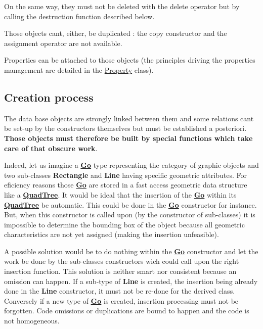 On the same way, they must not be deleted with the delete operator but by calling the destruction function described below.

Those objects can\textquotesingle{}t, either, be duplicated \+: the copy constructor and the assignment operator are not available.

Properties can be attached to those objects (the principles driving the properties management are detailed in the \mbox{\hyperlink{classHurricane_1_1Property}{Property}} class).\hypertarget{classHurricane_1_1DBo_sDBoCreation}{}\subsection{Creation process}\label{classHurricane_1_1DBo_sDBoCreation}
The data base objects are strongly linked between them and some relations can\textquotesingle{}t be set-\/up by the constructors themselves but must be established a posteriori. {\bfseries Those objects must therefore be built by special functions which take care of that obscure work}.

Indeed, let us imagine a {\bfseries \mbox{\hyperlink{classHurricane_1_1Go}{Go}}} type representing the category of graphic objects and two sub-\/classes {\bfseries Rectangle} and {\bfseries Line} having specific geometric attributes. For eficiency reasons those {\bfseries \mbox{\hyperlink{classHurricane_1_1Go}{Go}}} are stored in a fast access geometric data structure like a {\bfseries \mbox{\hyperlink{classHurricane_1_1QuadTree}{Quad\+Tree}}}. It would be ideal that the insertion of the {\bfseries \mbox{\hyperlink{classHurricane_1_1Go}{Go}}} within its {\bfseries \mbox{\hyperlink{classHurricane_1_1QuadTree}{Quad\+Tree}}} be automatic. This could be done in the {\bfseries \mbox{\hyperlink{classHurricane_1_1Go}{Go}}} constructor for instance. But, when this constructor is called upon (by the constructor of sub-\/classes) it is impossible to determine the bounding box of the object because all geometric characteristics are not yet assigned (making the insertion unfeasible).

A possible solution would be to do nothing within the {\bfseries \mbox{\hyperlink{classHurricane_1_1Go}{Go}}} constructor and let the work be done by the sub-\/classes constructors wich could call upon the right insertion function. This solution is neither smart nor consistent because an omission can happen. If a sub-\/type of {\bfseries Line} is created, the insertion being already done in the {\bfseries Line} constructor, it must not be re-\/done for the derived class. Conversely if a new type of {\bfseries \mbox{\hyperlink{classHurricane_1_1Go}{Go}}} is created, insertion processing must not be forgotten. Code omissions or duplications are bound to happen and the code is not homogeneous.

